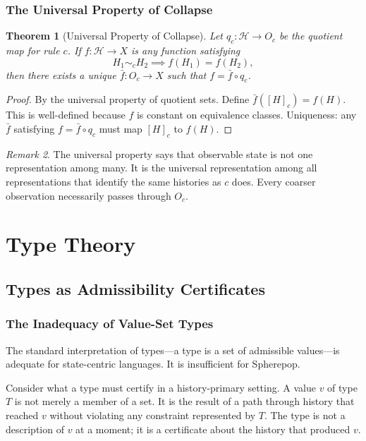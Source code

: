 \documentclass[12pt, a4paper, openany]{book}
\theoremstyle{plain}
\newtheorem{theorem}{Theorem}[chapter]
\theoremstyle{definition}
\theoremstyle{remark}
\newtheorem{remark}[theorem]{Remark}
\newcommand{\calH}{\mathcal{H}}
\begin{document}
\section{The Universal Property of Collapse}

\begin{theorem}[Universal Property of Collapse]
Let $q_c : \calH \to O_c$ be the quotient map for rule $c$. If $f : \calH \to X$
is any function satisfying
\[
H_1 \sim_c H_2 \implies f(H_1) = f(H_2),
\]
then there exists a unique $\bar{f} : O_c \to X$ such that $f = \bar{f} \circ q_c$.
\end{theorem}

\begin{proof}
By the universal property of quotient sets. Define $\bar{f}([H]_c) = f(H)$.
This is well-defined because $f$ is constant on equivalence classes. Uniqueness:
any $\bar{f}$ satisfying $f = \bar{f} \circ q_c$ must map $[H]_c$ to $f(H)$.
\end{proof}

\begin{remark}
The universal property says that observable state is not one representation among
many. It is the universal representation among all representations that identify
the same histories as $c$ does. Every coarser observation necessarily passes
through $O_c$.
\end{remark}

\part{Type Theory}

\chapter{Types as Admissibility Certificates}

\section{The Inadequacy of Value-Set Types}

The standard interpretation of types---a type is a set of admissible values---is
adequate for state-centric languages. It is insufficient for Spherepop.

Consider what a type must certify in a history-primary setting. A value $v$ of
type $T$ is not merely a member of a set. It is the result of a path through
history that reached $v$ without violating any constraint represented by $T$.
The type is not a description of $v$ at a moment; it is a certificate about the
history that produced $v$.
\end{document}
